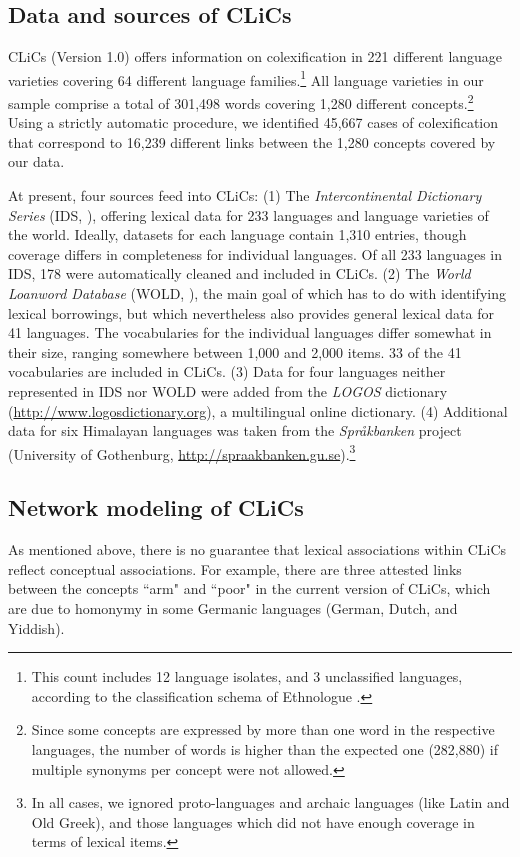 \subsection{Data and sources of CLiCs}
CLiCs (Version 1.0) offers information on colexification in 221 different language varieties
covering 64 different language families.\footnote{This count includes 12 language isolates, and 3
unclassified languages, according to the classification schema of Ethnologue \cite{Lewis2013}.} All language
varieties in our sample comprise a total of 301,498 words covering 1,280 different
concepts.\footnote{Since some concepts are expressed by more than one word in the respective
languages, the number of words is higher than the expected one (282,880) if multiple synonyms per
concept were not allowed.} Using a strictly automatic procedure, we identified 45,667 cases of
colexification that correspond to 16,239 different links between the 1,280 concepts covered by our
data. 

At present, four sources feed into CLiCs: (1) The \emph{Intercontinental Dictionary Series} (IDS,
), offering lexical data for 233 languages and language varieties of the world.
Ideally, datasets for each language contain 1,310 entries, though coverage differs in completeness
for individual languages. Of all 233 languages in IDS, 178 were automatically cleaned and included
in CLiCs. (2) The \emph{World Loanword Database} (WOLD, ), the main goal
of which has to do with identifying lexical borrowings, but which nevertheless also provides general
lexical data for 41 languages. The vocabularies for the individual languages differ somewhat in
their size, ranging somewhere between 1,000 and 2,000 items. 33 of the 41 vocabularies are included
in CLiCs.  (3) Data for four languages neither represented in IDS nor WOLD were added from the
\emph{LOGOS} dictionary (\url{http://www.logosdictionary.org}), a multilingual online dictionary.
(4) Additional data for six Himalayan languages was taken from the \emph{Spr\aa kbanken} project
(University of Gothenburg, \url{http://spraakbanken.gu.se}).\footnote{In all cases, we ignored
proto-languages and archaic languages (like Latin and Old Greek), and those languages which did not
have enough coverage in terms of lexical items.}

\subsection{Network modeling of CLiCs}
As mentioned above, there is no guarantee that lexical associations within CLiCs reflect conceptual
associations. For example, there are three attested links between the concepts ``arm" and ``poor" in
the current version of CLiCs, which are due to homonymy in some Germanic languages (German, Dutch,
and Yiddish).
 
